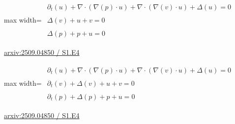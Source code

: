 \documentclass[10pt,a4paper]{article}
\begin{document}
\begin{minipage}{\linewidth}
\begin{center}\begin{adjustbox}{max width=\linewidth}$\displaystyle\begin{gathered}\begin{gathered}\partial_{t}(u)+\nabla\cdot(\nabla(p)\cdot u)+\nabla\cdot(\nabla(v)\cdot u)+\Delta(u)=0\end{gathered}\\[5pt]\begin{gathered}\Delta(v)+u+v=0\end{gathered}\\[5pt]\begin{gathered}\Delta(p)+p+u=0\end{gathered}\end{gathered}$\end{adjustbox}\end{center}
{\small \href{https://arxiv.org/html/2509.04850#S1.E4}{arxiv:2509.04850 / S1.E4}}\par
\end{minipage}\par\vspace{7mm}

\begin{minipage}{\linewidth}
\begin{center}\begin{adjustbox}{max width=\linewidth}$\displaystyle\begin{gathered}\begin{gathered}\partial_{t}(u)+\nabla\cdot(\nabla(p)\cdot u)+\nabla\cdot(\nabla(v)\cdot u)+\Delta(u)=0\end{gathered}\\[5pt]\begin{gathered}\partial_{t}(v)+\Delta(v)+u+v=0\end{gathered}\\[5pt]\begin{gathered}\partial_{t}(p)+\Delta(p)+p+u=0\end{gathered}\end{gathered}$\end{adjustbox}\end{center}
{\small \href{https://arxiv.org/html/2509.04850#S1.E4}{arxiv:2509.04850 / S1.E4}}\par
\end{minipage}\par\vspace{7mm}
\end{document}
